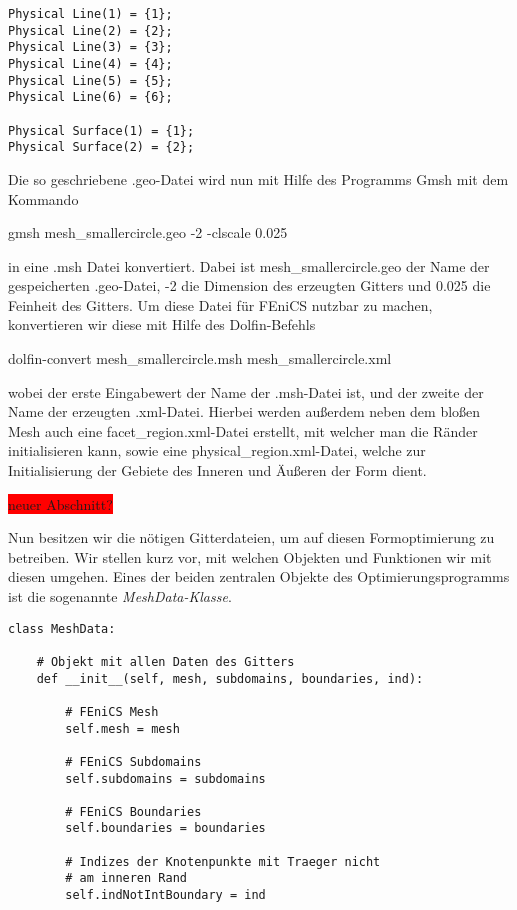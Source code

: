 \begin{lstlisting}
Physical Line(1) = {1};
Physical Line(2) = {2};
Physical Line(3) = {3};
Physical Line(4) = {4};
Physical Line(5) = {5};
Physical Line(6) = {6};

Physical Surface(1) = {1};
Physical Surface(2) = {2};
\end{lstlisting}

Die so geschriebene \textsf{.geo}-Datei wird nun mit Hilfe des Programms \textsf{Gmsh} mit dem Kommando

\begin{center}
\textsf{gmsh mesh\_smallercircle.geo -2 -clscale 0.025}
\end{center}

in eine \textsf{.msh} Datei konvertiert. Dabei ist \textsf{mesh\_smallercircle.geo}
der Name der gespeicherten \textsf{.geo}-Datei, \textsf{-2} die Dimension des erzeugten Gitters und \textsf{0.025} die Feinheit des Gitters. Um diese Datei für FEniCS nutzbar zu machen, konvertieren wir diese mit Hilfe des Dolfin-Befehls

\begin{center}
\textsf{dolfin-convert mesh\_smallercircle.msh mesh\_smallercircle.xml}
\end{center}

wobei der erste Eingabewert der Name der \textsf{.msh}-Datei ist, und der zweite der Name der erzeugten \textsf{.xml}-Datei. Hierbei werden außerdem neben dem bloßen Mesh auch eine \textsf{facet\_region.xml}-Datei erstellt, mit welcher man die Ränder initialisieren kann, sowie eine \textsf{physical\_region.xml}-Datei, welche zur Initialisierung der Gebiete des Inneren und Äußeren der Form dient.

\colorbox{red}{neuer Abschnitt?}

Nun besitzen wir die nötigen Gitterdateien, um auf diesen Formoptimierung zu betreiben. Wir stellen kurz vor, mit welchen Objekten und Funktionen wir mit diesen umgehen. Eines der beiden zentralen Objekte des Optimierungsprogramms ist die sogenannte \textit{MeshData-Klasse}. 

\begin{lstlisting}
class MeshData:

    # Objekt mit allen Daten des Gitters
    def __init__(self, mesh, subdomains, boundaries, ind):

        # FEniCS Mesh
        self.mesh = mesh

        # FEniCS Subdomains
        self.subdomains = subdomains

        # FEniCS Boundaries
        self.boundaries = boundaries

        # Indizes der Knotenpunkte mit Traeger nicht 
        # am inneren Rand
        self.indNotIntBoundary = ind
\end{lstlisting}

